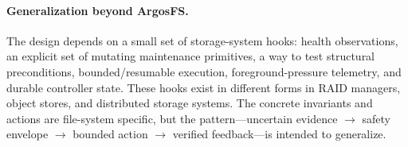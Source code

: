 \paragraph{Generalization beyond ArgosFS.}
The design depends on a small set of storage-system hooks: health observations, an explicit set of mutating maintenance primitives, a way to test structural preconditions, bounded/resumable execution, foreground-pressure telemetry, and durable controller state. These hooks exist in different forms in RAID managers, object stores, and distributed storage systems. The concrete invariants and actions are file-system specific, but the pattern---uncertain evidence $\rightarrow$ safety envelope $\rightarrow$ bounded action $\rightarrow$ verified feedback---is intended to generalize.

